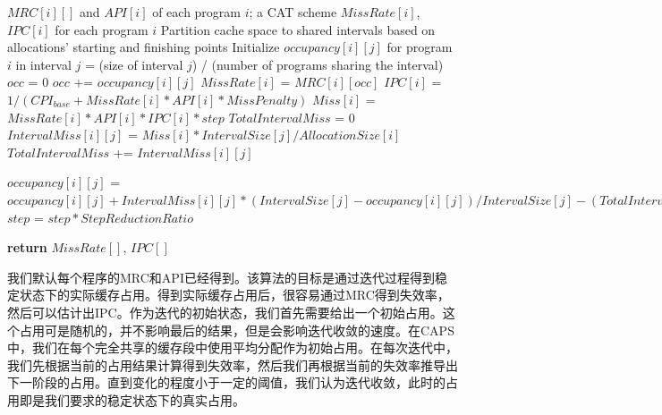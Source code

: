 \begin{algorithm}
\caption{预测算法伪代码}
\label{alg:pred}
\begin{algorithmic}[1]
\renewcommand{\algorithmicforall}{\textbf{foreach}}
\renewcommand{\algorithmicrequire}{\textbf{Input:}}
\renewcommand{\algorithmicensure}{\textbf{Output:}}
\REQUIRE $MRC[i][]$ and $API[i]$ of each program $i$; a CAT scheme
\ENSURE $MissRate[i]$, $IPC[i]$ for each program $i$
\STATE Partition cache space to shared intervals based on allocations' starting and finishing points
\STATE Initialize $occupancy[i][j]$ for program $i$ in interval $j$ = (size of interval $j$) / (number of programs sharing the interval)
    	\STATE $occ$ = $0$
			\STATE $occ$ += $occupancy[i][j]$
        \ENDFOR
        \STATE $MissRate[i]$ = $MRC[i][occ]$
        \STATE $IPC[i]$ = $1 / (CPI_{base} + MissRate[i] * API[i] * MissPenalty)$
        \STATE $Miss[i]$ = $MissRate[i] * API[i] * IPC[i] * step$
    \ENDFOR
    	\STATE $TotalIntervalMiss$ = $0$
        	\STATE $IntervalMiss[i][j]$ = $Miss[i] * IntervalSize[j] / AllocationSize[i]$
            \STATE $TotalIntervalMiss$ += $IntervalMiss[i][j]$ 
		\ENDFOR
        
        	\STATE $occupancy[i][j]$ =  $occupancy[i][j] + IntervalMiss[i][j] * (IntervalSize[j] - occupancy[i][j]) / IntervalSize[j] - (TotalIntervalMiss - IntervalMiss[i][j]) * occupancy[i][j] / IntervalSize[j]$
		\ENDFOR
    \ENDFOR
    	\STATE $step$ = $step * StepReductionRatio$
    \ENDIF
\ENDWHILE

\STATE \textbf{return} $MissRate[]$, $IPC[]$

\end{algorithmic}
\end{algorithm}

我们默认每个程序的MRC和API已经得到。该算法的目标是通过迭代过程得到稳定状态下的实际缓存占用。得到实际缓存占用后，很容易通过MRC得到失效率，然后可以估计出IPC。作为迭代的初始状态，我们首先需要给出一个初始占用。这个占用可是随机的，并不影响最后的结果，但是会影响迭代收敛的速度。在CAPS中，我们在每个完全共享的缓存段中使用平均分配作为初始占用。在每次迭代中，我们先根据当前的占用结果计算得到失效率，然后我们再根据当前的失效率推导出下一阶段的占用。直到变化的程度小于一定的阈值，我们认为迭代收敛，此时的占用即是我们要求的稳定状态下的真实占用。

